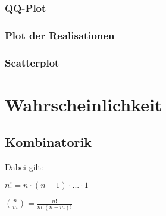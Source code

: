 \documentclass[8pt]{extarticle}
\begin{document}
\subsubsection{QQ-Plot}

\subsubsection{Plot der Realisationen}

\subsubsection{Scatterplot}




\section{Wahrscheinlichkeit}

\subsection{Kombinatorik}



\begin{minipage}[t]{0.7\textwidth}
\end{minipage}
\begin{Mathspez}
\begin{minipage}[b]{0.2\textwidth}
Dabei gilt: 


 $n!=n\cdot (n-1)\cdot ... \cdot 1$

 $\binom{n}{m} = \frac{n!}{m!(n-m)!}$

\end{minipage}
\end{Mathspez}
\end{document}
